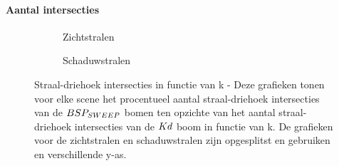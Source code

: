 \paragraph{Aantal intersecties}
\begin{figure}
  \centering
  \begin{subfigure}{\linewidth}
  \centering
  \begin{subfigure}[t]{.32\linewidth}
    \centering
{}
  \end{subfigure}
  \begin{subfigure}[t]{.32\linewidth}
    \centering
{}
\end{subfigure}
\begin{subfigure}[t]{.32\linewidth}
  \centering
{}
\end{subfigure}
\caption{Zichtstralen}
\end{subfigure}
\begin{subfigure}{\linewidth}
  \centering
  \begin{subfigure}[t]{.32\linewidth}
    \centering
{}
  \end{subfigure}
  \begin{subfigure}[t]{.32\linewidth}
    \centering
{}
\end{subfigure}
\begin{subfigure}[t]{.32\linewidth}
  \centering
{}
\end{subfigure}
\caption{Schaduwstralen}
\end{subfigure}
\caption[Straal-driehoek intersecties in functie van k]{Straal-driehoek intersecties in functie van k - \small Deze grafieken tonen voor elke scene het procentueel aantal straal-driehoek intersecties van de $BSP_{SWEEP}$ bomen ten opzichte van het aantal straal-driehoek intersecties van de $Kd$ boom in functie van k. De grafieken voor de zichtstralen en schaduwstralen zijn opgesplitst en gebruiken en verschillende y-as.}
\label{fig:k-intersecties}
\end{figure}


